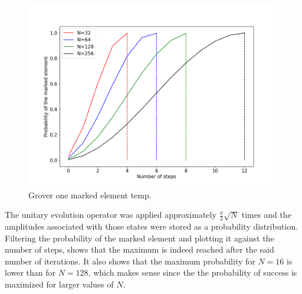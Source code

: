 \documentclass[../../dissertation.tex]{subfiles}
\begin{document}
\begin{figure}[!h]
	\centering
	\includegraphics[scale=0.40]{img/Grover/GroverOneMarked3264128256}
	\caption{Grover one marked element temp.} 
	\label{fig:groverOneMarked163264128}
\end{figure}
The unitary evolution operator was applied approximately $\frac{\pi}{4}\sqrt{N}$ times and the amplitudes associated with those states were stored as a probability distribution. Filtering the probability of the marked element and plotting it against the number of steps, shows that the maximum is indeed reached after the said number of iterations. It also shows that the maximum probability for $N=16$ is lower than for $N=128$, which makes sense since the the probability of success is maximized for larger values of $N$.
\end{document}
